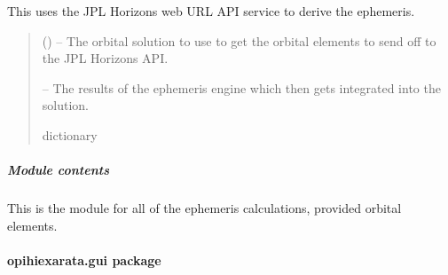 \documentclass[letterpaper,11pt,english]{sphinxmanual}
\begin{document}
\begin{savenotes}\begin{fulllineitems}
\label{\detokenize{code/opihiexarata.ephemeris.solution:opihiexarata.ephemeris.solution._vehicle_jpl_horizons_web_api}}
\pysigstartsignatures
{}
\pysigstopsignatures
\sphinxAtStartPar
This uses the JPL Horizons web URL API service to derive the ephemeris.
\begin{quote}\begin{description}
\sphinxAtStartPar
{} ({\hyperref[\detokenize{code/opihiexarata.orbit.solution:opihiexarata.orbit.solution.OrbitalSolution}]{}}) – The orbital solution to use to get the orbital elements to send off to
the JPL Horizons API.

\sphinxAtStartPar
{} – The results of the ephemeris engine which then gets integrated into
the solution.

\sphinxAtStartPar
dictionary

\end{description}\end{quote}

\end{fulllineitems}\end{savenotes}



\subparagraph{Module contents}
\label{\detokenize{code/opihiexarata.ephemeris:module-opihiexarata.ephemeris}}\label{\detokenize{code/opihiexarata.ephemeris:module-contents}}
\sphinxAtStartPar
This is the module for all of the ephemeris calculations, provided
orbital elements.

\sphinxstepscope


\paragraph{opihiexarata.gui package}
\label{\detokenize{code/opihiexarata.gui:opihiexarata-gui-package}}\label{\detokenize{code/opihiexarata.gui::doc}}
\end{document}
